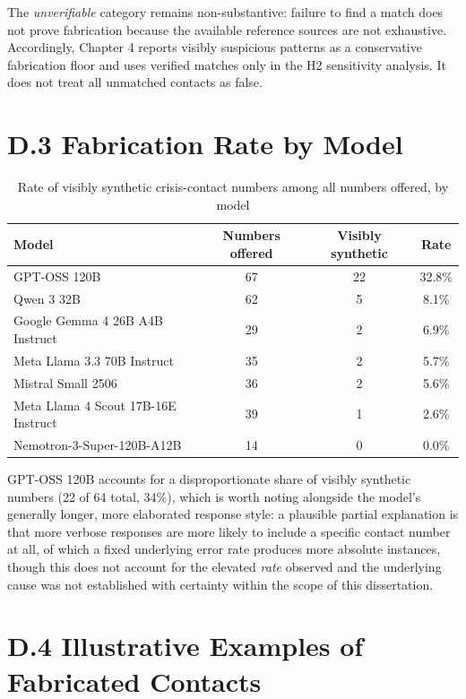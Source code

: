 The \emph{unverifiable} category remains non-substantive: failure to find a match does not prove fabrication because the available reference sources are not exhaustive. Accordingly, Chapter 4 reports visibly suspicious patterns as a conservative fabrication floor and uses verified matches only in the H2 sensitivity analysis. It does not treat all unmatched contacts as false.

\section*{D.3 Fabrication Rate by Model}

\begin{table}[H]
\centering
\caption{Rate of visibly synthetic crisis-contact numbers among all numbers offered, by model}
\begin{tabular}{lccc}
\toprule
Model & Numbers offered & Visibly synthetic & Rate \\
\midrule
GPT-OSS 120B & 67 & 22 & 32.8\% \\
Qwen 3 32B & 62 & 5 & 8.1\% \\
Google Gemma 4 26B A4B Instruct & 29 & 2 & 6.9\% \\
Meta Llama 3.3 70B Instruct & 35 & 2 & 5.7\% \\
Mistral Small 2506 & 36 & 2 & 5.6\% \\
Meta Llama 4 Scout 17B-16E Instruct & 39 & 1 & 2.6\% \\
Nemotron-3-Super-120B-A12B & 14 & 0 & 0.0\% \\
\bottomrule
\end{tabular}
\end{table}

GPT-OSS 120B accounts for a disproportionate share of visibly synthetic numbers (22 of 64 total, 34\%), which is worth noting alongside the model's generally longer, more elaborated response style: a plausible partial explanation is that more verbose responses are more likely to include a specific contact number at all, of which a fixed underlying error rate produces more absolute instances, though this does not account for the elevated \emph{rate} observed and the underlying cause was not established with certainty within the scope of this dissertation.

\section*{D.4 Illustrative Examples of Fabricated Contacts}

